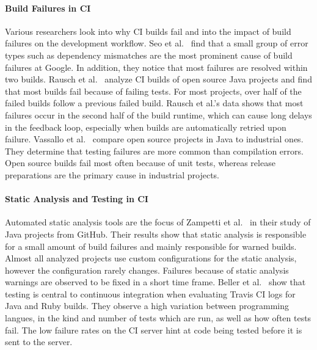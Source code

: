 \documentclass[\myrootdir/main.tex]{subfiles}
\begin{document}
\paragraph{Build Failures in CI}
Various researchers look into why CI builds fail and into the impact of build failures on the development workflow.
Seo et al.~\cite{seo2014programmers} find that a small group of error types such as dependency mismatches are the most prominent cause of build failures at Google.
In addition, they notice that most failures are resolved within two builds.
Rausch et al.~\cite{rausch2017empirical} analyze CI builds of open source Java projects and find that most builds fail because of failing tests.
For most projects, over half of the failed builds follow a previous failed build.
Rausch et al.'s data shows that most failures occur in the second half of the build runtime, which can cause long delays in the feedback loop, especially when builds are automatically retried upon failure.
Vassallo et al.~\cite{vassallo2017a-tale} compare open source projects in Java to industrial ones.
They determine that testing failures are more common than compilation errors.
Open source builds fail most often because of unit tests, whereas release preparations are the primary cause in industrial projects.

\paragraph{Static Analysis and Testing in CI}
Automated static analysis tools are the focus of Zampetti et al.~\cite{zampetti2017open} in their study of Java projects from GitHub.
Their results show that static analysis is responsible for a small amount of build failures and mainly responsible for warned builds.
Almost all analyzed projects use custom configurations for the static analysis, however the configuration rarely changes.
Failures because of static analysis warnings are observed to be fixed in a short time frame.
Beller et al.~\cite{beller2017oops} show that testing is central to continuous integration when evaluating Travis CI logs for Java and Ruby builds.
They observe a high variation between programming langues, in the kind and number of tests which are run, as well as how often tests fail.
The low failure rates on the CI server hint at code being tested before it is sent to the server.
\end{document}
